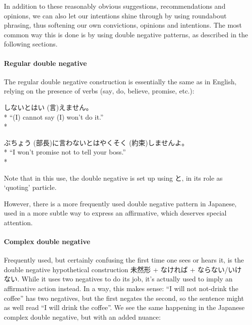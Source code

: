 \documentclass[11pt, b5paper, twoside, openright, onecolumn]{book}
\makeatletter
\newcommand*{\rubystack}[2]{{\relscale{0.5}%
  \begin{tabular}[b]{@{}c@{}}%
    {#1}\\%
   {\textscale{2}{#2}}%
  \end{tabular}}%
}
\DeclareRobustCommand*{\ruby}[2]{%
  \mbox{%
    \setlength{\parskip}{0ex}%
    \BeginAccSupp{method=pdfstringdef,ActualText={#1}}%
      \rubystack{\phantom{#2}}{#1}%
      \llap{%
        \rubystack{#2}{\phantom{#1}}%
      }%
    \EndAccSupp{}%
  }%
}
\renewcommand*{\ruby}[2]{#2 (#1)}%
\newenvironment{exampleblock}{
\setlength{\parindent}{0.6in}
\begin{minipage}[t]{\dimexpr\textwidth-\parindent}}
{\end{minipage}}
\makeatother
\begin{document}
In addition to these reasonably obvious suggestions‚ recommendations and opinions‚ we can also let our intentions shine through by using roundabout phrasing‚ thus softening our own convictions‚ opinions and intentions. The most common way this is done is by using double negative patterns‚ as described in the following sections.


\paragraph{Regular double negative}

The regular double negative construction is essentially the same as in English‚ relying on the presence of  verbs (say‚ do‚ believe‚ promise‚ etc.):

\vspace{0.4cm}
\begin{exampleblock}
しないとは\ruby{言}{い}えません。 \\* 
“(I) cannot say (I) won’t do it.” \\* 
\end{exampleblock}
\vspace{0.2cm}

\begin{exampleblock}
\ruby{部長}{ぶちょう}に言わないとは\ruby{約束}{やくそく}しませんよ。 \\* 
“I won’t promise not to tell your boss.” \\* 
\end{exampleblock}
\vspace{0.2cm}

Note that in this use‚ the double negative is set up using と‚ in its role as ‘quoting’ particle.

However‚ there is a more frequently used double negative pattern in Japanese‚ used in a more subtle way to express an affirmative‚ which deserves special attention.


\paragraph{Complex double negative}

Frequently used‚ but certainly confusing the first time one sees or hears it‚ is the double negative hypothetical construction 未然形 + なければ + ならない/いけない. While it uses two negatives to do its job‚ it’s actually used to imply an affirmative action instead. In a way‚ this makes sense: “I will not not-drink the coffee” has two negatives‚ but the first negates the second‚ so the sentence might as well read “I will drink the coffee”. We see the same happening in the Japanese complex double negative‚ but with an added nuance:
\end{document}
